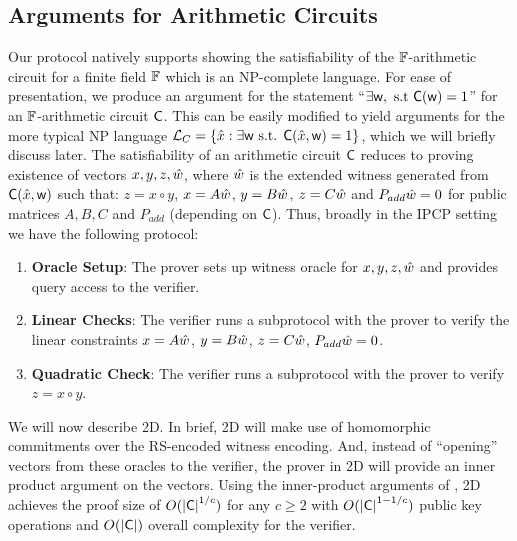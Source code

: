 \subsection{Arguments for Arithmetic Circuits}
Our protocol natively supports showing the satisfiability of the $\mathbb{F}$-arithmetic circuit for a finite field $\mathbb{F}$ which
is an %
NP-complete language. For ease of presentation, we produce an argument for the statement ``$\exists \mathsf{w}, \text{ s.t } \mathsf{C}(\mathsf{w})=1$'' for an $\mathbb{F}$-arithmetic circuit $\mathsf{C}$. This can be easily modified to yield arguments for the more typical %
NP language $\mathcal{L}_C = \{\hat{x} :\exists \mathsf{w} \text{ s.t. } \mathsf{C}(\hat{x},\mathsf{w})=1\}$, which we will briefly discuss later. The satisfiability of an arithmetic circuit $\mathsf{C}$ reduces to proving existence of vectors $x,y,z,\hat{w}$, where $\hat{w}$ is the extended witness generated from $\mathsf{C}(\hat{x},\mathsf{w})$ such that:
$z = x \circ y$,
$x = A \hat{w}$,
$y = B \hat{w}$,
$z = C \hat{w}$ and
$P_{add} \hat{w} = 0$ for public matrices $A,B,C$ and $P_{add}$ (depending on $\mathsf{C}$). Thus, broadly in the IPCP setting we have the following protocol:
\begin{enumerate}
\item {\bf Oracle Setup}: The prover sets up witness oracle for $x,y,z,\hat{w}$ and provides query access to the verifier. 
\item {\bf Linear Checks}: The verifier runs a subprotocol with the prover to verify the linear constraints $x=A \hat{w}$, $y=B \hat{w}$, $z=C \hat{w}$, $P_{add} \hat{w} = 0$.
\item {\bf Quadratic Check}: The verifier runs a subprotocol with the prover to verify $z=x\circ y$.
\end{enumerate}


We will now describe \name2D{}. In brief, \name2D{} will make use of homomorphic commitments over the RS-encoded witness encoding.
And, instead of ``opening'' vectors from these oracles to the verifier, the prover in \name2D{} will provide an inner product argument on the vectors.
Using the inner-product arguments of \cite{InnerProductDLS, bulletproofs}, \name2D{} achieves the proof size of $O(\mathsf{|C|}^{1/c})$ for any $c \geq 2$ with $O(\mathsf{|C|}^{1-1/c})$ public key operations and $O(\mathsf{|C|})$ overall complexity for the verifier. 

